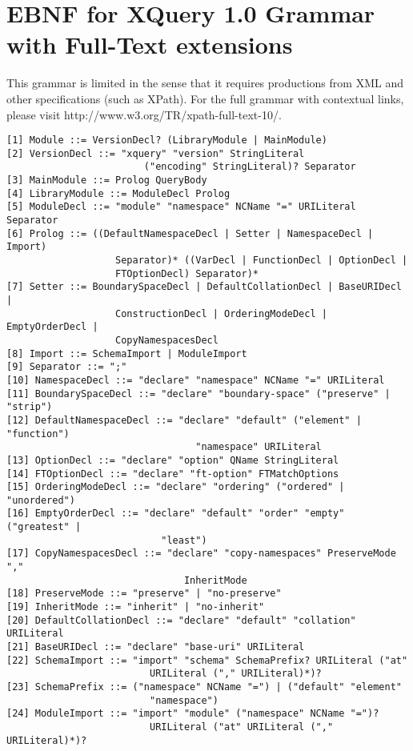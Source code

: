 \chapter{EBNF for XQuery 1.0 Grammar with Full-Text extensions}
This grammar is limited in the sense that it requires productions from XML and
other specifications (such as XPath). For the full grammar with contextual
links, please visit http://www.w3.org/TR/xpath-full-text-10/. 

\begin{Verbatim}[frame=none, fontsize=\footnotesize]
[1] Module ::= VersionDecl? (LibraryModule | MainModule)
[2] VersionDecl ::= "xquery" "version" StringLiteral 
                        ("encoding" StringLiteral)? Separator
[3] MainModule ::= Prolog QueryBody
[4] LibraryModule ::= ModuleDecl Prolog
[5] ModuleDecl ::= "module" "namespace" NCName "=" URILiteral Separator
[6] Prolog ::= ((DefaultNamespaceDecl | Setter | NamespaceDecl | Import)
                   Separator)* ((VarDecl | FunctionDecl | OptionDecl |
                   FTOptionDecl) Separator)*
[7] Setter ::= BoundarySpaceDecl | DefaultCollationDecl | BaseURIDecl |
                   ConstructionDecl | OrderingModeDecl | EmptyOrderDecl |
                   CopyNamespacesDecl 
[8] Import ::= SchemaImport | ModuleImport 
[9] Separator ::= ";"
[10] NamespaceDecl ::= "declare" "namespace" NCName "=" URILiteral
[11] BoundarySpaceDecl ::= "declare" "boundary-space" ("preserve" | "strip")
[12] DefaultNamespaceDecl ::= "declare" "default" ("element" | "function")
                                 "namespace" URILiteral
[13] OptionDecl ::= "declare" "option" QName StringLiteral
[14] FTOptionDecl ::= "declare" "ft-option" FTMatchOptions
[15] OrderingModeDecl ::= "declare" "ordering" ("ordered" | "unordered")
[16] EmptyOrderDecl ::= "declare" "default" "order" "empty" ("greatest" |
                           "least")
[17] CopyNamespacesDecl ::= "declare" "copy-namespaces" PreserveMode ","
                               InheritMode 
[18] PreserveMode ::= "preserve" | "no-preserve" 
[19] InheritMode ::= "inherit" | "no-inherit"
[20] DefaultCollationDecl ::= "declare" "default" "collation" URILiteral
[21] BaseURIDecl ::= "declare" "base-uri" URILiteral
[22] SchemaImport ::= "import" "schema" SchemaPrefix? URILiteral ("at"
                         URILiteral ("," URILiteral)*)?
[23] SchemaPrefix ::= ("namespace" NCName "=") | ("default" "element"
                         "namespace")
[24] ModuleImport ::= "import" "module" ("namespace" NCName "=")?
                         URILiteral ("at" URILiteral ("," URILiteral)*)?

\end{Verbatim}

